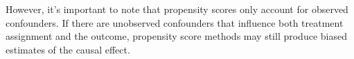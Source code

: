 However, it's important to note that propensity scores only account for observed confounders. If there are unobserved confounders that influence both treatment assignment and the outcome, propensity score methods may still produce biased estimates of the causal effect.





